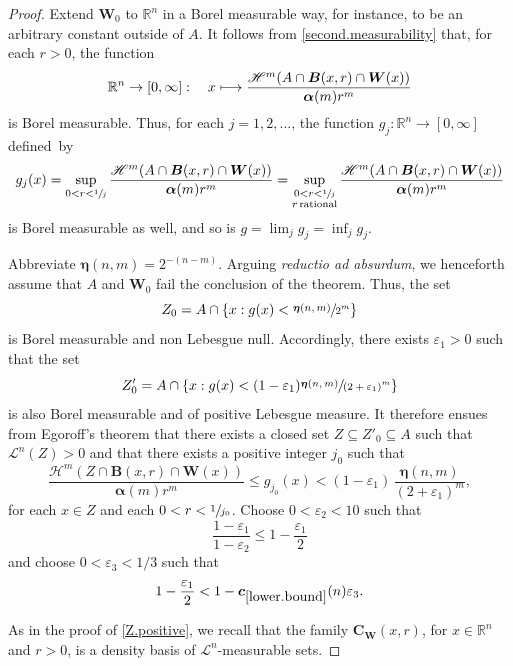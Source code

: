 \documentclass[JEP,XML,SOM,Unicode,ThmDefs,NoEqCountersInSection]{cedram}
\newcommand\mto{\mathchoice{\longmapsto}{\mapsto}{\mapsto}{\mapsto}}
\newcommand{\R}{\mathbb{R}}
\newcommand{\Rn}{\R^n}
\newcommand{\calH}{\mathscr{H}}
\newcommand{\calL}{\mathscr{L}}
\newcommand{\balpha}{\boldsymbol{\alpha}}
\newcommand{\boldeta}{\boldsymbol{\eta}}
\newcommand{\bB}{{\boldsymbol{B}}}
\newcommand{\bC}{{\boldsymbol{C}}}
\newcommand{\bW}{{\boldsymbol{W}}}
\newcommand{\bc}{{\boldsymbol{c}}}
\let\veps\varepsilon
\let\subset\subseteq
\begin{document}
\begin{proof}
Extend $\bW_0$ to $\Rn$ in a Borel measurable way, for instance, to be an arbitrary constant outside of $A$.
It follows from \ref{second.measurability} that, for each $r > 0$, the function
\[
\Rn \to [0,\infty]:\quad x \mto \frac{\calH^m (A \cap \bB(x,r) \cap \bW(x))}{\balpha(m)r^m}
\]
is Borel measurable.
Thus, for each $j\!=\!1,2,\ldots$, the function $g_j\!:\! \Rn \!\to\! [0,\infty]$ defined~by
\begin{equation*}
g_j(x) = \sup_{0 < r < \sfrac{1}{j}} \frac{\calH^m (A \cap \bB(x,r) \cap \bW(x))}{\balpha(m)r^m}
= \sup_{\substack{0 < r < \sfrac{1}{j}\\r \,\text{rational} }} \frac{\calH^m (A \cap \bB(x,r) \cap \bW(x))}{\balpha(m)r^m}
\end{equation*}
is Borel measurable as well, and so is $g = \lim_j g_j = \inf_j g_j$.
\par
Abbreviate $\boldeta(n,m) = 2^{-(n-m)}$.
Arguing \emph{reductio ad absurdum}, we henceforth assume that $A$ and $\bW_0$ fail the conclusion of the theorem.
Thus, the set
\[
Z_0 = A \cap \left\{ x: g(x) < \sfrac{\boldeta(n,m)}{2^m}\right\}
\]
is Borel measurable and non Lebesgue null.
Accordingly, there exists $\veps_1 > 0$ such that the set
\[
Z_0' = A \cap \left\{ x: g(x) < (1-\veps_1) \sfrac{\boldeta(n,m)}{(2+\veps_1)^m}\right\}
\]
is also Borel measurable and of positive Lebesgue measure.
It therefore ensues from Egoroff's theorem \cite[2.3.7]{GMT} that there exists a closed set $Z \subset Z'_0 \subset A$ such that $\calL^n(Z) > 0$ and that there exists a positive integer $j_0$ such that
\begin{equation}
\label{final.1}
\frac{\calH^m\left(Z \cap \bB(x,r) \cap \bW(x)\right)}{\balpha(m)r^m} \leq g_{j_0}(x) < (1-\veps_1)\, \frac{\boldeta(n,m)}{(2 + \veps_1)^m},
\end{equation}
for each $x \in Z$ and each $0 < r < \sfrac{1}{j_0}$.
Choose $0 < \veps_2 < 10$ such that
\begin{equation}
\label{final.2}
\frac{1-\veps_1}{1-\veps_2} \leq 1 - \frac{\veps_1}{2}
\end{equation}
and choose $0 < \veps_3 < 1/3$ such that
\begin{equation}
\label{final.3}
1 - \frac{\veps_1}{2} < 1 - \bc_{\ref{lower.bound}}(n) \veps_3.
\end{equation}
\par
As in the proof of \ref{Z.positive}, we recall that the family $\bC_\bW(x,r)$, for $x \in \Rn$ and $r > 0$, is a density basis of $\calL^n$-measurable sets.

\end{proof}
\end{document}

